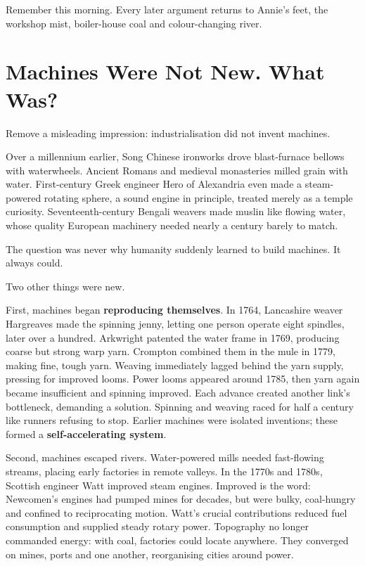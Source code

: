 Remember this morning. Every later argument returns to Annie's feet, the workshop mist, boiler-house coal and colour-changing river.

\section{Machines Were Not New. What Was?}
Remove a misleading impression: industrialisation did not invent machines.

Over a millennium earlier, Song Chinese ironworks drove blast-furnace bellows with waterwheels. Ancient Romans and medieval monasteries milled grain with water. First-century Greek engineer Hero of Alexandria even made a steam-powered rotating sphere, a sound engine in principle, treated merely as a temple curiosity. Seventeenth-century Bengali weavers made muslin like flowing water, whose quality European machinery needed nearly a century barely to match.

The question was never why humanity suddenly learned to build machines. It always could.

Two other things were new.

First, machines began \textbf{reproducing themselves}. In 1764, Lancashire weaver Hargreaves made the spinning jenny, letting one person operate eight spindles, later over a hundred. Arkwright patented the water frame in 1769, producing coarse but strong warp yarn. Crompton combined them in the mule in 1779, making fine, tough yarn. Weaving immediately lagged behind the yarn supply, pressing for improved looms. Power looms appeared around 1785, then yarn again became insufficient and spinning improved. Each advance created another link's bottleneck, demanding a solution. Spinning and weaving raced for half a century like runners refusing to stop. Earlier machines were isolated inventions; these formed a \textbf{self-accelerating system}.

Second, machines escaped rivers. Water-powered mills needed fast-flowing streams, placing early factories in remote valleys. In the 1770s and 1780s, Scottish engineer Watt improved steam engines. Improved is the word: Newcomen's engines had pumped mines for decades, but were bulky, coal-hungry and confined to reciprocating motion. Watt's crucial contributions reduced fuel consumption and supplied steady rotary power. Topography no longer commanded energy: with coal, factories could locate anywhere. They converged on mines, ports and one another, reorganising cities around power.

